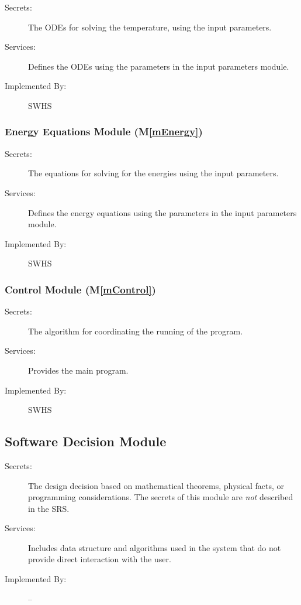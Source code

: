\documentclass[12pt]{article}
\newcommand{\mref}[1]{M\ref{#1}}
\begin{document}
\begin{description}
\item[Secrets:] The ODEs for solving the temperature, using the input parameters.
\item[Services:] Defines the ODEs using the parameters in the input parameters module.
\item[Implemented By:] SWHS
\end{description} 

\subsubsection{Energy Equations Module (\mref{mEnergy})}

\begin{description}
\item[Secrets:] The equations for solving for the energies using the input parameters.
\item[Services:] Defines the energy equations using the parameters in the input
  parameters module.
\item[Implemented By:] SWHS
\end{description} 
 
\subsubsection{Control Module (\mref{mControl})}

\begin{description}
\item[Secrets:] The algorithm for coordinating the running of the program.
\item[Services:] Provides the main program.
\item[Implemented By:] SWHS
\end{description}

\subsection{Software Decision Module}

\begin{description}
\item[Secrets:] The design decision based on mathematical theorems, physical
  facts, or programming considerations. The secrets of this module are
  \emph{not} described in the SRS.
\item[Services:] Includes data structure and algorithms used in the system that
  do not provide direct interaction with the user. 
\item[Implemented By:] --
\end{description}
\end{document}
